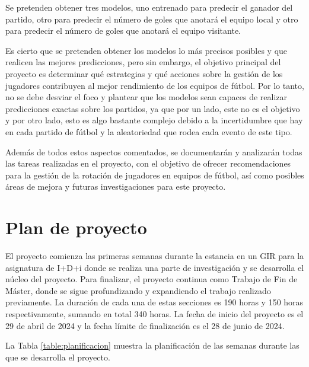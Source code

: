 Se pretenden obtener tres modelos, uno entrenado para predecir el ganador del partido, otro para predecir el número de goles que anotará el equipo local y otro para predecir el número de goles que anotará el equipo visitante. 

Es cierto que se pretenden obtener los modelos lo más precisos posibles y que realicen las mejores predicciones, pero sin embargo, el objetivo principal del proyecto es determinar qué estrategias y qué acciones sobre la gestión de los jugadores contribuyen al mejor rendimiento de los equipos de fútbol. Por lo tanto, no se debe desviar el foco y plantear que los modelos sean capaces de realizar predicciones exactas sobre los partidos, ya que por un lado, este no es el objetivo y por otro lado, esto es algo bastante complejo debido a la incertidumbre que hay en cada partido de fútbol y la aleatoriedad que rodea cada evento de este tipo.

Además de todos estos aspectos comentados, se documentarán y analizarán todas las tareas realizadas en el proyecto, con el objetivo de ofrecer recomendaciones para la gestión de la rotación de jugadores en equipos de fútbol, así como posibles áreas de mejora y futuras investigaciones para este proyecto.




\section{Plan de proyecto}

El proyecto comienza las primeras semanas durante la estancia en un GIR para la asignatura de I+D+i donde se realiza una parte de investigación y se desarrolla el núcleo del proyecto. Para finalizar, el proyecto continua como Trabajo de Fin de Máster, donde se sigue profundizando y expandiendo el trabajo realizado previamente. La duración de cada una de estas secciones es 190 horas y 150 horas respectivamente, sumando en total 340 horas. La fecha de inicio del proyecto es el 29 de abril de 2024 y la fecha límite de finalización es el 28 de junio de 2024.


La Tabla \ref{table:planificacion} muestra la planificación de las semanas durante las que se desarrolla el proyecto.

